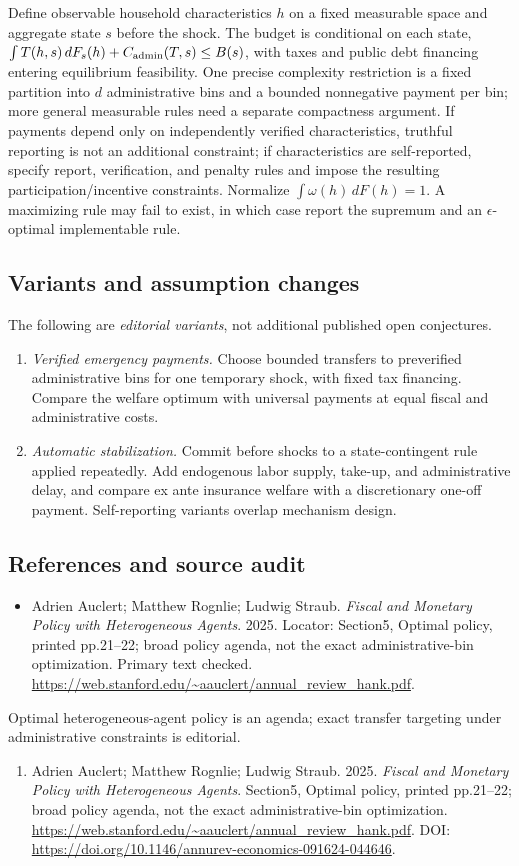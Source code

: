 \documentclass[11pt,a4paper]{article}
\begin{document}
Define observable household characteristics \(h\) on a fixed measurable space and aggregate state \(s\) before the shock. The budget is conditional on each state, \(\int T(h,s)\,dF_s(h)+C_{\rm admin}(T,s)\le B(s)\), with taxes and public debt financing entering equilibrium feasibility. One precise complexity restriction is a fixed partition into \(d\) administrative bins and a bounded nonnegative payment per bin; more general measurable rules need a separate compactness argument. If payments depend only on independently verified characteristics, truthful reporting is not an additional constraint; if characteristics are self-reported, specify report, verification, and penalty rules and impose the resulting participation/incentive constraints. Normalize \(\int\omega(h)\,dF(h)=1\). A maximizing rule may fail to exist, in which case report the supremum and an \(\epsilon\)-optimal implementable rule.
\subsection*{Variants and assumption changes}
The following are \emph{editorial variants}, not additional published open conjectures.
\begin{enumerate}
\item \emph{Verified emergency payments.} Choose bounded transfers to preverified administrative bins for one temporary shock, with fixed tax financing. Compare the welfare optimum with universal payments at equal fiscal and administrative costs.
\item \emph{Automatic stabilization.} Commit before shocks to a state-contingent rule applied repeatedly. Add endogenous labor supply, take-up, and administrative delay, and compare ex ante insurance welfare with a discretionary one-off payment. Self-reporting variants overlap mechanism design.
\end{enumerate}
\subsection*{References and source audit}
\begin{itemize}
\item Adrien Auclert; Matthew Rognlie; Ludwig Straub. \emph{Fiscal and Monetary Policy with Heterogeneous Agents}. 2025. Locator: Section5, Optimal policy, printed pp.21--22; broad policy agenda, not the exact administrative-bin optimization. Primary text checked. \url{https://web.stanford.edu/~aauclert/annual_review_hank.pdf}.
\end{itemize}
Optimal heterogeneous-agent policy is an agenda; exact transfer targeting under administrative constraints is editorial.
\begin{enumerate}\raggedright
\item\hypertarget{definitions:source:30007534:1}{} Adrien Auclert; Matthew Rognlie; Ludwig Straub. 2025. \emph{Fiscal and Monetary Policy with Heterogeneous Agents}. Section5, Optimal policy, printed pp.21--22; broad policy agenda, not the exact administrative-bin optimization.
\url{https://web.stanford.edu/~aauclert/annual_review_hank.pdf}.
DOI: \url{https://doi.org/10.1146/annurev-economics-091624-044646}.
\end{enumerate}
\end{document}
